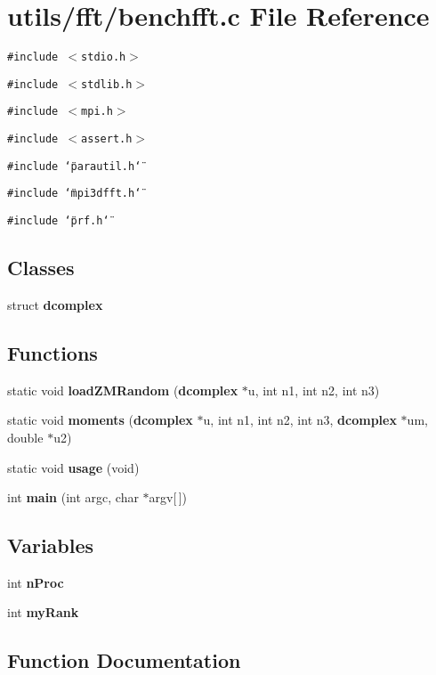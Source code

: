 \section{utils/fft/benchfft.c File Reference}
\label{benchfft_8c}
{\tt \#include $<$stdio.h$>$}\par
{\tt \#include $<$stdlib.h$>$}\par
{\tt \#include $<$mpi.h$>$}\par
{\tt \#include $<$assert.h$>$}\par
{\tt \#include \char`\"{}parautil.h\char`\"{}}\par
{\tt \#include \char`\"{}mpi3dfft.h\char`\"{}}\par
{\tt \#include \char`\"{}prf.h\char`\"{}}\par
\subsection*{Classes}
\begin{CompactItemize}
\item 
struct {\bf dcomplex}
\end{CompactItemize}
\subsection*{Functions}
\begin{CompactItemize}
\item 
static void {\bf load\-ZMRandom} ({\bf dcomplex} $\ast$u, int n1, int n2, int n3)
\item 
static void {\bf moments} ({\bf dcomplex} $\ast$u, int n1, int n2, int n3, {\bf dcomplex} $\ast$um, double $\ast$u2)
\item 
static void {\bf usage} (void)
\item 
int {\bf main} (int argc, char $\ast$argv[$\,$])
\end{CompactItemize}
\subsection*{Variables}
\begin{CompactItemize}
\item 
int {\bf n\-Proc}
\item 
int {\bf my\-Rank}
\end{CompactItemize}


\subsection{Function Documentation}
